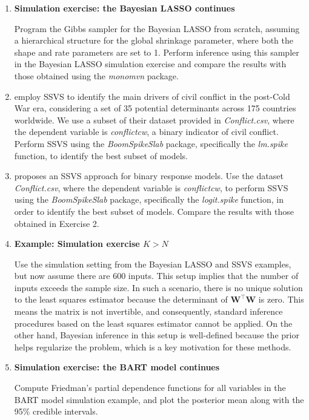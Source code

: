 \begin{enumerate}
	\item \textbf{Simulation exercise: the Bayesian LASSO continues}
	
	Program the Gibbs sampler for the Bayesian LASSO from scratch, assuming a hierarchical structure for the global shrinkage parameter, where both the shape and rate parameters are set to 1. Perform inference using this sampler in the Bayesian LASSO simulation exercise and compare the results with those obtained using the \textit{monomvn} package.
	
	\item \cite{jetter2022postcold} employ SSVS to identify the main drivers of civil conflict in the post-Cold War era, considering a set of 35 potential determinants across 175 countries worldwide. We use a subset of their dataset provided in \textit{Conflict.csv}, where the dependent variable is \textit{conflictcw}, a binary indicator of civil conflict. Perform SSVS using the \textit{BoomSpikeSlab} package, specifically the \textit{lm.spike} function, to identify the best subset of models.
	
	\item \cite{tuchler2008bayesian} proposes an SSVS approach for binary response models. Use the dataset \textit{Conflict.csv}, where the dependent variable is \textit{conflictcw}, to perform SSVS using the \textit{BoomSpikeSlab} package, specifically the \textit{logit.spike} function, in order to identify the best subset of models. Compare the results with those obtained in Exercise 2.
	
	\item \textbf{Example: Simulation exercise $K > N$}
	
	Use the simulation setting from the Bayesian LASSO and SSVS examples, but now assume there are 600 inputs. This setup implies that the number of inputs exceeds the sample size. In such a scenario, there is no unique solution to the least squares estimator because the determinant of $\mathbf{W}^{\top} \mathbf{W}$ is zero. This means the matrix is not invertible, and consequently, standard inference procedures based on the least squares estimator cannot be applied. On the other hand, Bayesian inference in this setup is well-defined because the prior helps regularize the problem, which is a key motivation for these methods.
	
	\item \textbf{Simulation exercise: the BART model continues} 
	
	Compute Friedman’s partial dependence functions \cite{friedman2001greedy} for all variables in the BART model simulation example, and plot the posterior mean along with the 95\% credible intervals.
	

\end{enumerate}
